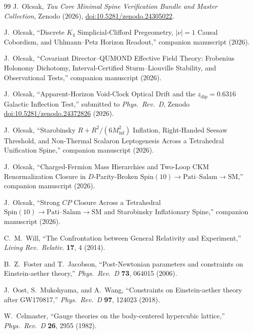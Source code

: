 \documentclass[11pt,a4paper]{article}
\begin{document}
\begin{thebibliography}{99}
J.~Olcsak, \emph{Tau Core Minimal Spine Verification Bundle and Master Collection}, Zenodo (2026), \href{https://doi.org/10.5281/zenodo.24305022}{doi:10.5281/zenodo.24305022}.

J.~Olcsak, ``Discrete $K_4$ Simplicial-Clifford Pregeometry, $|\nu|=1$ Causal Cobordism, and Uhlmann--Petz Horizon Readout,'' companion manuscript (2026).

J.~Olcsak, ``Covariant Director--QUMOND Effective Field Theory: Frobenius Holonomy Dichotomy, Interval-Certified Sturm--Liouville Stability, and Observational Tests,'' companion manuscript (2026).

J.~Olcsak, ``Apparent-Horizon Void-Clock Optical Drift and the $z_{\mathrm{dip}} = 0.6316$ Galactic Inflection Test,'' submitted to \emph{Phys.\ Rev.\ D}, Zenodo \href{https://doi.org/10.5281/zenodo.24372826}{doi:10.5281/zenodo.24372826} (2026).

J.~Olcsak, ``Starobinsky $R + R^2/(6 M_{\mathrm{inf}}^2)$ Inflation, Right-Handed Seesaw Threshold, and Non-Thermal Scalaron Leptogenesis Across a Tetrahedral Unification Spine,'' companion manuscript (2026).

J.~Olcsak, ``Charged-Fermion Mass Hierarchies and Two-Loop CKM Renormalization Closure in $D$-Parity-Broken $\mathrm{Spin}(10) \to \mathrm{Pati\text{--}Salam} \to \mathrm{SM}$,'' companion manuscript (2026).

J.~Olcsak, ``Strong $CP$ Closure Across a Tetrahedral $\mathrm{Spin}(10) \to \mathrm{Pati\text{--}Salam} \to \mathrm{SM}$ and Starobinsky Inflationary Spine,'' companion manuscript (2026).

C.~M.~Will, ``The Confrontation between General Relativity and Experiment,'' \emph{Living Rev.\ Relativ.} \textbf{17}, 4 (2014).

B.~Z.~Foster and T.~Jacobson, ``Post-Newtonian parameters and constraints on Einstein-aether theory,'' \emph{Phys.\ Rev.\ D} \textbf{73}, 064015 (2006).

J.~Oost, S.~Mukohyama, and A.~Wang, ``Constraints on Einstein-aether theory after GW170817,'' \emph{Phys.\ Rev.\ D} \textbf{97}, 124023 (2018).

W.~Celmaster, ``Gauge theories on the body-centered hypercubic lattice,'' \emph{Phys.\ Rev.\ D} \textbf{26}, 2955 (1982).


\end{thebibliography}
\end{document}
